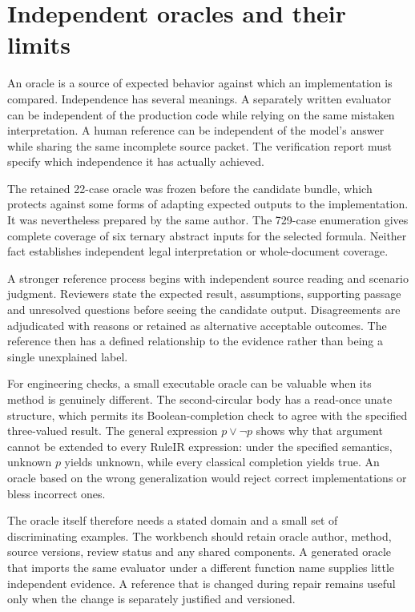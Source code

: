 \section{Independent oracles and their limits}
\label{merge:M07:05}


An oracle is a source of expected behavior against which an implementation is
compared. Independence has several meanings. A separately written evaluator can
be independent of the production code while relying on the same mistaken
interpretation. A human reference can be independent of the model's answer while
sharing the same incomplete source packet. The verification report must specify
which independence it has actually achieved.

The retained 22-case oracle was frozen before the candidate bundle, which protects
against some forms of adapting expected outputs to the implementation. It was
nevertheless prepared by the same author. The 729-case enumeration gives complete
coverage of six ternary abstract inputs for the selected formula. Neither fact
establishes independent legal interpretation or whole-document coverage.

A stronger reference process begins with independent source reading and scenario
judgment. Reviewers state the expected result, assumptions, supporting passage
and unresolved questions before seeing the candidate output. Disagreements are
adjudicated with reasons or retained as alternative acceptable outcomes. The
reference then has a defined relationship to the evidence rather than being a
single unexplained label.


For engineering checks, a small executable oracle can be valuable when its method
is genuinely different. The second-circular body has a read-once unate structure,
which permits its Boolean-completion check to agree with the specified
three-valued result. The general expression $p\lor\neg p$ shows why that argument
cannot be extended to every RuleIR expression: under the specified semantics,
unknown $p$ yields unknown, while every classical completion yields true.
An oracle based on the wrong generalization would reject correct implementations
or bless incorrect ones.

The oracle itself therefore needs a stated domain and a small set of discriminating
examples. The workbench should retain oracle author, method, source versions,
review status and any shared components. A generated oracle that imports the same
evaluator under a different function name supplies little independent evidence.
A reference that is changed during repair remains useful only when the change is
separately justified and versioned.

